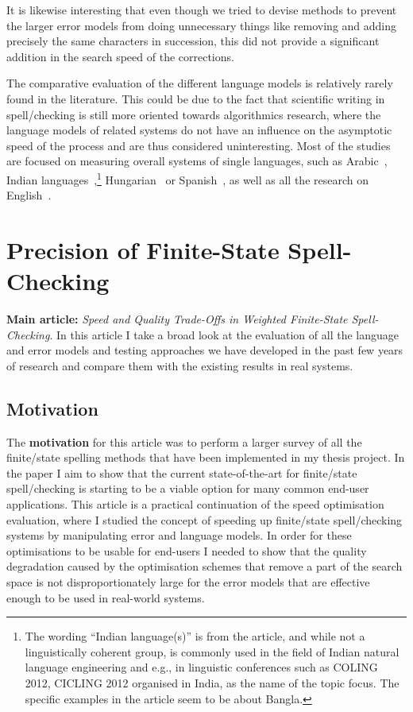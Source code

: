 \documentclass[officiallayout,final]{unihelcompling}
\begin{document}
It is likewise interesting that even though we tried to devise methods to
prevent the larger error models from doing unnecessary things like removing and
adding precisely the same characters in succession, this did not provide a
significant addition in the search speed of the corrections.

The comparative evaluation of the different language models is relatively
rarely found in the literature. This could be due to the fact that scientific
writing in spell\-/checking is still more oriented towards algorithmics
research, where the language models of related systems do not have an influence
on the asymptotic speed of the process and are thus considered uninteresting.
Most of the studies are focused on measuring overall systems of single
languages, such as Arabic~\citep{attia2013improved}, Indian
languages~\citep{chaudhuri2002towards},\footnote{The wording ``Indian
    language(s)'' is from the article, and while not a linguistically coherent
    group, is commonly used in the field of Indian natural language engineering
and e.g., in linguistic conferences such as COLING 2012, CICLING 2012 organised
in India, as the name of the topic focus. The specific examples in the article
seem to be about Bangla.} Hungarian~\citep{tron2005hunmorph} or
Spanish~\cite{otero2007contextual}, as well as all the research on
English~\citep{mitton1987spelling}.

\section{Precision of Finite-State Spell-Checking}
\label{sec:quality}

\textbf{Main article:} \emph{Speed and Quality Trade-Offs in Weighted
Finite-State Spell-Checking}. In this article I take a broad look at the
evaluation of all the language and error models and testing approaches we have
developed in the past few years of research and compare them with the existing
results in real systems.

\subsection{Motivation}

The \textbf{motivation} for this article was to perform a larger survey of all
the finite\-/state spelling methods that have been implemented in my thesis
project. In the paper I aim to show that the current state-of-the-art for
finite\-/state spell\-/checking is starting to be a viable option for many
common end-user applications. This article is a practical continuation of the
speed optimisation evaluation, where I studied the concept of speeding up
finite\-/state spell\-/checking systems by manipulating error and language
models. In order for these optimisations to be usable for end-users I needed to
show that the quality degradation caused by the optimisation schemes that
remove a part of the search space is not disproportionately large for the error
models that are effective enough to be used in real-world systems.
\end{document}
